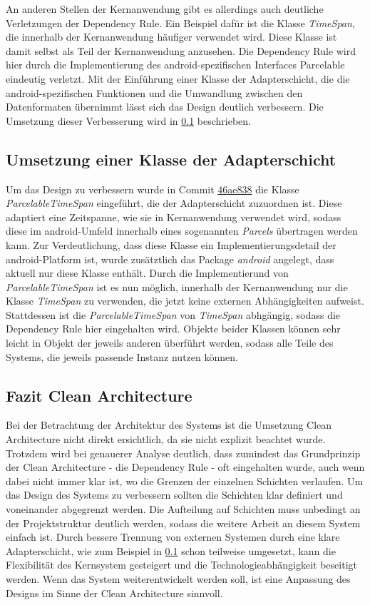 An anderen Stellen der Kernanwendung gibt es allerdings auch deutliche Verletzungen der Dependency Rule.
Ein Beispiel dafür ist die Klasse \textit{TimeSpan}, die innerhalb der Kernanwendung häufiger verwendet wird.
Diese Klasse ist damit selbst als Teil der Kernanwendung anzusehen.
Die Dependency Rule wird hier durch die Implementierung des android-spezifischen Interfaces Parcelable eindeutig verletzt. 
Mit der Einführung einer Klasse der Adapterschicht, die die android-spezifischen Funktionen und die Umwandlung zwischen den Datenformaten übernimmt lässt sich das Design deutlich verbessern.
Die Umsetzung dieser Verbesserung wird in \ref{sec:TimeSpanAdapter} beschrieben.

\subsection{Umsetzung einer Klasse der Adapterschicht}
\label{sec:TimeSpanAdapter}
Um das Design zu verbessern wurde in Commit \href{https://github.com/lukaspanni/OpenSourceStats/commit/46ae8389947276f033a738a454d29a615655be09}{46ae838} die Klasse \textit{ParcelableTimeSpan} eingeführt, die der Adapterschicht zuzuordnen ist.
Diese adaptiert eine Zeitspanne, wie sie in Kernanwendung verwendet wird, sodass diese im android-Umfeld innerhalb eines sogenannten \textit{Parcels} übertragen werden kann.
Zur Verdeutlichung, dass diese Klasse ein Implementierungsdetail der android-Platform ist, wurde zusätztlich das Package \textit{android} angelegt, dass aktuell nur diese Klasse enthält.
Durch die Implementierund von \textit{ParcelableTimeSpan} ist es nun möglich, innerhalb der Kernanwendung nur die Klasse \textit{TimeSpan} zu verwenden, die jetzt keine externen Abhängigkeiten aufweist.
Stattdessen ist die \textit{ParcelableTimeSpan} von \textit{TimeSpan} abhgängig, sodass die Dependency Rule hier eingehalten wird.
Objekte beider Klassen können sehr leicht in Objekt der jeweils anderen überführt werden, sodass alle Teile des Systems, die jeweils passende Instanz nutzen können.

\subsection{Fazit Clean Architecture}
Bei der Betrachtung der Architektur des Systems ist die Umsetzung Clean Architecture nicht direkt ersichtlich, da sie nicht explizit beachtet wurde.
Trotzdem wird bei genauerer Analyse deutlich, dass zumindest das Grundprinzip der Clean Architecture - die Dependency Rule - oft eingehalten wurde, auch wenn dabei nicht immer klar ist, wo die Grenzen der einzelnen Schichten verlaufen.
Um das Design des Systems zu verbessern sollten die Schichten klar definiert und voneinander abgegrenzt werden.
Die Aufteilung auf Schichten muss unbedingt an der Projektstruktur deutlich werden, sodass die weitere Arbeit an diesem System einfach ist.
Durch bessere Trennung von externen Systemen durch eine klare Adapterschicht, wie zum Beispiel in \ref{sec:TimeSpanAdapter} schon teilweise umgesetzt, kann die Flexibilität des Kernsystem gesteigert und die Technologieabhängigkeit beseitigt werden.
Wenn das System weiterentwickelt werden soll, ist eine Anpassung des Designs im Sinne der Clean Architecture sinnvoll.